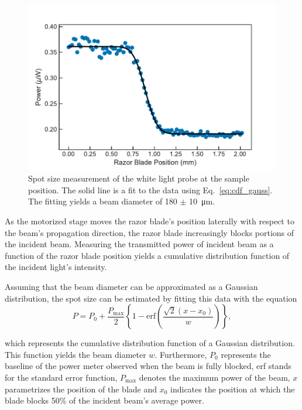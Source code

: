 \begin{figure}[h]
	\centering
	\includegraphics[scale=0.65]{images/chapter_methods/probe_spot_size}
	\caption{Spot size measurement of the white light probe at the sample position. The solid line is a fit to the data using Eq.\ \ref{eq:cdf_gauss}. The fitting yields a beam diameter of 180 $\pm$ \SI{10}{\micro\meter}. }
\end{figure}


As the motorized stage moves the razor blade's position laterally with respect to the beam's propagation direction, the razor blade increasingly blocks portions of the incident beam.  Measuring the transmitted power of incident beam as a function of the razor blade position yields a cumulative distribution function of the incident light's intensity.


Assuming that the beam diameter can be approximated as a Gaussian distribution, the spot size can be estimated by fitting this data with the equation
\begin{equation}
	\label{eq:cdf_gauss}
	P = P_0 + \dfrac{P_{\mathrm{max}}}{2} \left\{ 1 - \mathrm{erf} \left( \dfrac{\sqrt{2}(x - x_0)}{w} \right) \right\},
\end{equation}

which represents the cumulative distribution function of a Gaussian distribution. This function yields the beam diameter $w$. Furthermore, $P_0$ represents the baseline of the power meter observed when the beam is fully blocked, erf stands for the standard error function, $P_\text{max}$ denotes the maximum power of the beam, $x$ parametrizes the position of the blade and $x_0$ indicates the position at which the blade blocks 50\% of the incident beam's average power.

